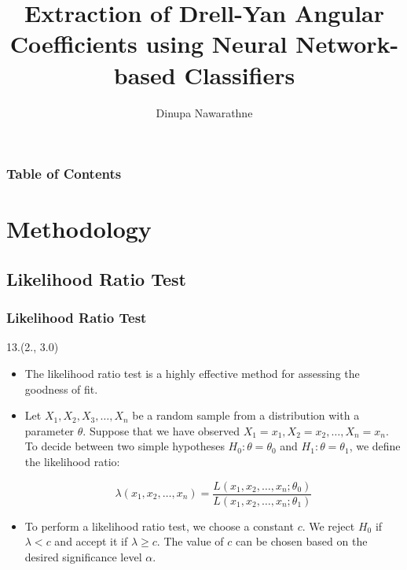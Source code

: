 \documentclass[12pt, xcolor={dvipsnames}, aspectratio = 169, sans,mathserif]{beamer}
\newenvironment{List}[2]
{\begin{textblock}{#1}#2
\begin{itemize}}
{\end{itemize}
\end{textblock}}
\begin{document}
\title{Extraction of Drell-Yan Angular Coefficients using Neural Network-based Classifiers}
\author{Dinupa Nawarathne}


\begin{frame}
  \maketitle
\end{frame}

\begin{frame}
\frametitle{Table of Contents}
\tableofcontents
\end{frame}

\section{Methodology}
\subsection{Likelihood Ratio Test}

\begin{frame}
\frametitle{Likelihood Ratio Test}

\begin{List}{13.}{(2., 3.0)}

  \item The likelihood ratio test is a highly effective method for assessing the goodness of fit.

  \item Let $X_1, X_2, X_3, \ldots, X_n$ be a random sample from a distribution with a parameter $\theta$. Suppose that
  we have observed $X_1 = x_1, X_2 = x_2, \ldots, X_n = x_n$. To decide between two simple hypotheses $H_0: \theta = \theta_0$
  and $H_1: \theta = \theta_1$, we define the likelihood ratio:

  \begin{equation*}
  \lambda(x_1, x_2, \ldots, x_n) = \frac{L(x_1, x_2, \ldots, x_n; \theta_0)}{L(x_1, x_2, \ldots, x_n; \theta_1)}
  \end{equation*}

  \item To perform a likelihood ratio test, we choose a constant $c$. We reject $H_0$ if $\lambda < c$ and accept it if
  $\lambda \geq c$. The value of $c$ can be chosen based on the desired significance level $\alpha$.

\end{List}

\end{frame}
\end{document}
